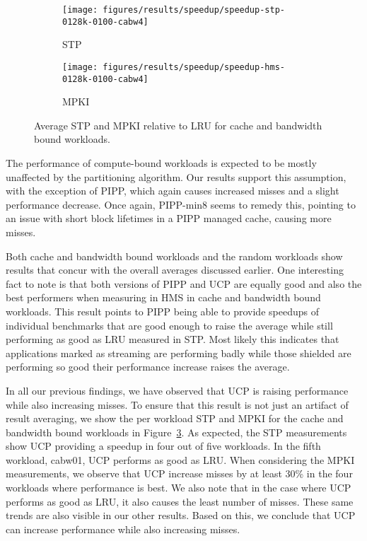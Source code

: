 \begin{figure}[th]
    \centering
    \begin{subfigure}[b]{0.6\textwidth}
        \texttt{[image: figures/results/speedup/speedup-stp-0128k-0100-cabw4]}
        \caption{STP}
        \label{fig:results:base:cabw:stp}
    \end{subfigure}
    \begin{subfigure}[b]{0.6\textwidth}
        \texttt{[image: figures/results/speedup/speedup-hms-0128k-0100-cabw4]}
        \caption{MPKI}
        \label{fig:results:base:cabw:mpki}
    \end{subfigure}
    \caption{Average STP and MPKI relative to LRU for cache and bandwidth bound workloads.}
    \label{fig:results:base:cabw} 
\end{figure}

The performance of compute-bound workloads is expected to be mostly unaffected by the partitioning algorithm. 
Our results support this assumption, with the exception of PIPP, which again causes increased misses and a slight performance decrease.
Once again, PIPP-min8 seems to remedy this, pointing to an issue with short block lifetimes in a PIPP managed cache, causing more misses.

Both cache and bandwidth bound workloads and the random workloads show results that concur with the overall averages discussed earlier.
One interesting fact to note is that both versions of PIPP and UCP are equally good and also the best performers when measuring in HMS in cache and bandwidth bound workloads.
This result points to PIPP being able to provide speedups of individual benchmarks that are good enough to raise the average while still performing as good as LRU measured in STP.
Most likely this indicates that applications marked as streaming are performing badly while those shielded are performing so good their performance increase raises the average.


In all our previous findings, we have observed that UCP is raising performance while also increasing misses.
To ensure that this result is not just an artifact of result averaging, we show the per workload STP and MPKI for the cache and bandwidth bound workloads in Figure~\ref{fig:results:base:cabw}.
As expected, the STP measurements show UCP providing a speedup in four out of five workloads.
In the fifth workload, cabw01, UCP performs as good as LRU.
When considering the MPKI measurements, we observe that UCP increase misses by at least 30\% in the four workloads where performance is best.
We also note that in the case where UCP performs as good as LRU, it also causes the least number of misses.
These same trends are also visible in our other results.
Based on this, we conclude that UCP can increase performance while also increasing misses.